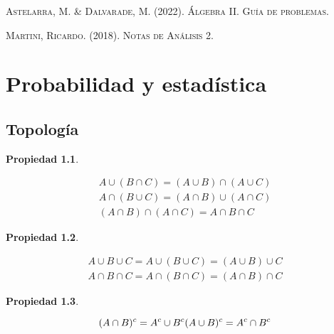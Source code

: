\documentclass[a5paper,12pt,twoside]{book}
\newtheorem{prop}{{Propiedad}}[chapter]
\begin{document}
\begin{thebibliography}{2}
     \textsc{Astelarra, M. \& Dalvarade, M. (2022). Álgebra II. Guía de problemas.}
    
     \textsc{Martini, Ricardo. (2018). Notas de Análisis 2.}
\end{thebibliography}


\chapter{Probabilidad y estadística}


\section{Topología}

\begin{mdframed}[style=MyFrame1]
    \begin{prop}
    \end{prop}
    \begin{gather*}
        A \cup (B \cap C) = (A \cup B) \cap (A \cup C)
        \\
        A \cap (B \cup C) = (A \cap B) \cup (A \cap C)
        \\[1ex]
        (A \cap B) \cap (A \cap C) = A \cap B \cap C
    \end{gather*}
\end{mdframed}

\begin{mdframed}[style=MyFrame1]
    \begin{prop}
    \end{prop}
    \begin{gather*}
        A \cup B \cup C = A \cup (B \cup C) = (A \cup B) \cup C
        \\
        A \cap B \cap C = A \cap (B \cap C) = (A \cap B) \cap C
    \end{gather*}
\end{mdframed}

\begin{mdframed}[style=MyFrame1]
    \begin{prop}
    \end{prop}
    \begin{equation*}
        (A \cap B)^c = A^c \cup B^c
        \\
        (A \cup B)^c = A^c \cap B^c
    \end{equation*}
\end{mdframed}
\end{document}
